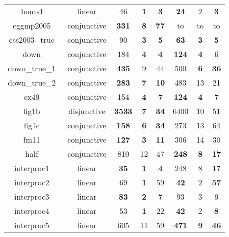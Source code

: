\begin{table}[t]
\begin{tabular}{l c | c c c | c c c |}
\multicolumn{1}{|c|}{bound~\cite{gupta2009invgen}}				&linear 		&46	&\textbf{1}	&\textbf{3}	&\textbf{24}	&2	&\textbf{3}\\
\multicolumn{1}{|c|}{cggmp2005~\cite{Dirk:SVCOMP:2016}}			&conjunctive	&\textbf{331}	&\textbf{8}	&\textbf{77}	&to	&to	&to	\\
\multicolumn{1}{|c|}{css2003\_true~\cite{Dirk:SVCOMP:2016}}		&conjunctive	&90	&\textbf{3}	&\textbf{5}	&\textbf{63}	&\textbf{3}	&\textbf{5}\\ 
\multicolumn{1}{|c|}{down~\cite{gupta2009invgen}}				&conjunctive	&184	&\textbf{4}	&\textbf{4}       &\textbf{124}	&\textbf{4}	&6		\\
\multicolumn{1}{|c|}{down\_true\_1~\cite{Dirk:SVCOMP:2016}}		&conjunctive 	&\textbf{435}	&9	&44	&500	&\textbf{6}	&\textbf{36}\\
\multicolumn{1}{|c|}{down\_true\_2~\cite{Dirk:SVCOMP:2016}}		&conjunctive 	&\textbf{283}	&\textbf{7}	&\textbf{10}	&483	&13	&21\\
\multicolumn{1}{|c|}{ex49~\cite{necla:benchmark}}				&conjunctive	&154	&\textbf{4}	&\textbf{7}	&\textbf{124}	&\textbf{4}	&\textbf{7}\\
\multicolumn{1}{|c|}{fig1b~\cite{zilu:repo}}					&disjunctive	&\xmark\textbf{3533} 	& \textbf{7} &\textbf{34} 	   & 6400 & 10 		& 51 		\\
\multicolumn{1}{|c|}{fig1c~\cite{zilu:repo}}					&conjunctive	&\textbf{158}	&\textbf{6}	&\textbf{34}	&273	&13	&64\\
\multicolumn{1}{|c|}{fm11~\cite{schwartznon}}					&conjunctive	&\textbf{127}	&\textbf{3}	&\textbf{11}	&306	&14	&30					\\
\multicolumn{1}{|c|}{half~\cite{gupta2009invgen}}				&conjunctive	&810	&12	&47 &\textbf{248}	&\textbf{8}	&\textbf{17}\\
\multicolumn{1}{|c|}{interproc1~\cite{jeannet2010interproc}}	&linear			&\textbf{35}	&\textbf{1}	&\textbf{4}   &248	&8	&17						\\
\multicolumn{1}{|c|}{interproc2~\cite{jeannet2010interproc}}	&linear 		&69	&\textbf{1}	&59	&\textbf{42}	&2	&\textbf{57}\\
\multicolumn{1}{|c|}{interproc3~\cite{jeannet2010interproc}}	&linear			&\textbf{83}	&\textbf{2}	&\textbf{7}   &93	&3	&9			\\
\multicolumn{1}{|c|}{interproc4~\cite{jeannet2010interproc}}	&linear 		&53	&\textbf{1}	&22	&\textbf{42}	&2	&\textbf{8}\\
\multicolumn{1}{|c|}{interproc5~\cite{jeannet2010interproc}}	&linear			&605	&11	&59 &\textbf{471}	&\textbf{9}	&\textbf{46}\\

\end{tabular}
\end{table}

